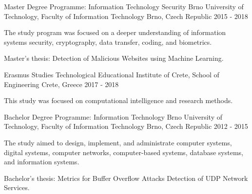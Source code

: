 \begin{cventries}

  \cventry
    {Master Degree Programme: Information Technology Security}
    {Brno University of Technology, Faculty of Information Technology}
    {Brno, Czech Republic}
    {2015 - 2018}
    {
      \begin{cvitems}
        \item {The study program was focused on a deeper understanding of information systems security, cryptography, data transfer, coding, and biometrics.}
        \item {Master's thesis: Detection of Malicious Websites using Machine Learning.}
      \end{cvitems}
    }

  \cventry
    {Erasmus Studies}
    {Technological Educational Institute of Crete, School of Engineering}
    {Crete, Greece}
    {2017 - 2018}
    {
      \begin{cvitems}
        \item {This study was focused on computational intelligence and research methods.}
      \end{cvitems}
    }

  \cventry
    {Bachelor Degree Programme: Information Technology}
    {Brno University of Technology, Faculty of Information Technology}
    {Brno, Czech Republic}
    {2012 - 2015}
    {
      \begin{cvitems}
        \item {The study aimed to design, implement, and administrate computer systems, digital systems, computer networks, computer-based systems, database systems, and information systems.}
        \item {Bachelor's thesis: Metrics for Buffer Overflow Attacks Detection of UDP Network Services.}
      \end{cvitems}
    }
\end{cventries}
